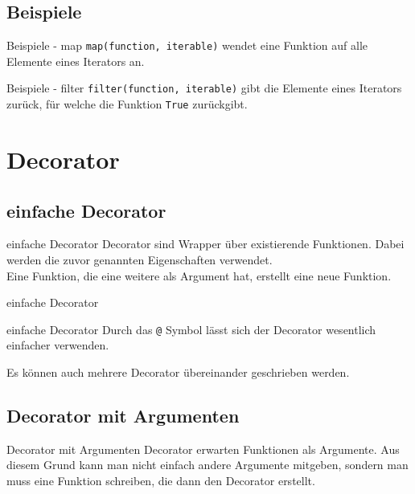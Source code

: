 \subsection{Beispiele}
\begin{frame}{Beispiele - map}
	\alert{\texttt{map(function, iterable)}} wendet eine Funktion auf alle Elemente eines Iterators an.
	
\end{frame}
\begin{frame}{Beispiele - filter}
	\alert{\texttt{filter(function, iterable)}} gibt die Elemente eines Iterators zurück, für welche die Funktion \alert{\texttt{True}} zurückgibt.
	
\end{frame}


\section{Decorator}
\subsection{einfache Decorator}
\begin{frame}{einfache Decorator}
	Decorator sind Wrapper über existierende Funktionen. Dabei werden die zuvor genannten Eigenschaften verwendet.\\
	Eine Funktion, die eine weitere als Argument hat, erstellt eine neue Funktion.
	
\end{frame}
\begin{frame}{einfache Decorator}
	
\end{frame}

\begin{frame}[fragile]{einfache Decorator}
	Durch das \alert{\texttt{@} Symbol} lässt sich der Decorator wesentlich einfacher verwenden.
	
	Es können auch mehrere Decorator übereinander geschrieben werden.
\end{frame}

\subsection{Decorator mit Argumenten}
\begin{frame}{Decorator mit Argumenten}
	Decorator erwarten Funktionen als Argumente. Aus diesem Grund kann man nicht einfach andere Argumente mitgeben, sondern man muss eine Funktion schreiben, die dann den Decorator erstellt.
	
\end{frame}
	

